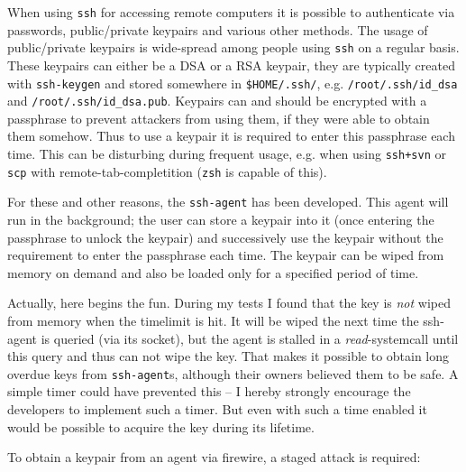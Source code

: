 When using \texttt{ssh} for accessing remote computers it is possible to
authenticate via passwords, public/private keypairs and various other methods.
The usage of public/private keypairs is wide-spread among people using
\texttt{ssh} on a regular basis. These keypairs can either be a DSA or a RSA
keypair, they are typically created with \texttt{ssh-keygen} and stored
somewhere in \texttt{\$HOME/.ssh/}, e.g.  \texttt{/root/.ssh/id\_dsa} and
\texttt{/root/.ssh/id\_dsa.pub}. Keypairs can and should be encrypted with a
passphrase to prevent attackers from using them, if they were able to obtain
them somehow. Thus to use a keypair it is required to enter this passphrase each
time. This can be disturbing during frequent usage, e.g. when using
\texttt{ssh+svn} or \texttt{scp} with remote-tab-completition (\texttt{zsh} is
capable of this).

For these and other reasons, the \texttt{ssh-agent} has been developed. This
agent will run in the background; the user can store a keypair into it (once
entering the passphrase to unlock the keypair) and successively use the keypair
without the requirement to enter the passphrase each time. The keypair can be
wiped from memory on demand and also be loaded only for a specified period of
time.

Actually, here begins the fun. During my tests I found that the key is
\emph{not} wiped from memory when the timelimit is hit. It will be wiped the
next time the ssh-agent is queried (via its socket), but the agent is stalled in
a \emph{read}-systemcall until this query and thus can not wipe the key. That
makes it possible to obtain long overdue keys from \texttt{ssh-agent}s, although
their owners believed them to be safe. A simple timer could have prevented this
-- I hereby strongly encourage the developers to implement such a timer. But
even with such a time enabled it would be possible to acquire the key during its
lifetime.

To obtain a keypair from an agent via firewire, a staged attack is required:

